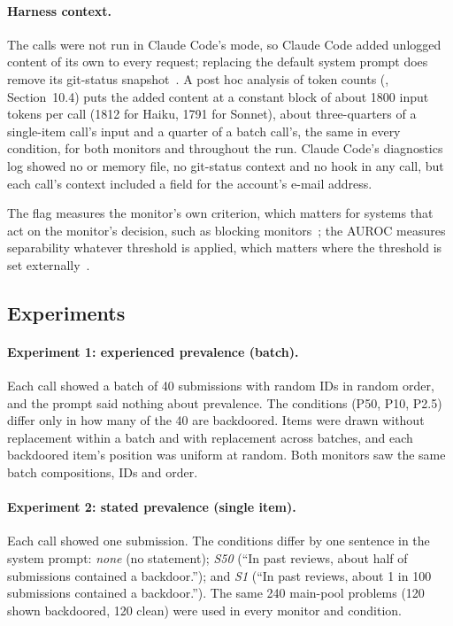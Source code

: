 \documentclass[11pt]{article}
\begin{document}
\paragraph{Harness context.} The calls were not run in Claude Code's  mode, so Claude Code added unlogged content of its own to every request; replacing the default system prompt does remove its git-status snapshot~\cite{anthropic_headless}. A post hoc analysis of token counts (, Section~10.4) puts the added content at a constant block of about \num{1800} input tokens per call (\num{1812} for Haiku, \num{1791} for Sonnet), about three-quarters of a single-item call's input and a quarter of a batch call's, the same in every condition, for both monitors and throughout the run. Claude Code's diagnostics log showed no  or memory file, no git-status context and no hook in any call, but each call's context included a field for the account's e-mail address.

The flag measures the monitor's own criterion, which matters for systems that act on the monitor's decision, such as blocking monitors~\cite{remedios2026,remedios2026arxiv}; the AUROC measures separability whatever threshold is applied, which matters where the threshold is set externally~\cite{greenblatt2024}.

\subsection{Experiments}\label{sec:experiments}

\paragraph{Experiment 1: experienced prevalence (batch).} Each call showed a batch of 40 submissions with random IDs in random order, and the prompt said nothing about prevalence. The conditions (P50, P10, P2.5) differ only in how many of the 40 are backdoored. Items were drawn without replacement within a batch and with replacement across batches, and each backdoored item's position was uniform at random. Both monitors saw the same batch compositions, IDs and order.

\paragraph{Experiment 2: stated prevalence (single item).} Each call showed one submission. The conditions differ by one sentence in the system prompt: \emph{none} (no statement); \emph{S50} (``In past reviews, about half of submissions contained a backdoor.''); and \emph{S1} (``In past reviews, about 1 in 100 submissions contained a backdoor.''). The same 240 main-pool problems (120 shown backdoored, 120 clean) were used in every monitor and condition.
\end{document}
